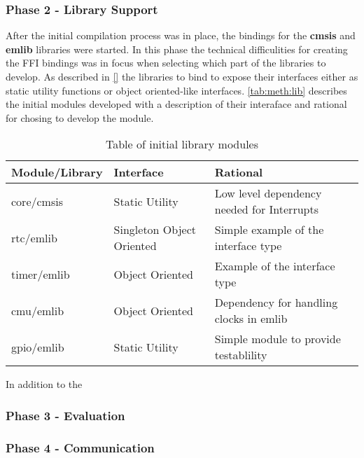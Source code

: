 \subsubsection{Phase 2 - Library Support}

After the initial compilation process was in place, the bindings for the \textbf{cmsis} and \textbf{emlib} libraries were started.
In this phase the technical difficulities for creating the FFI bindings was in focus when selecting which part of the libraries to develop.
As described in \autoref{}  the libraries to bind to expose their interfaces either as static utility functions or object oriented-like interfaces.
\autoref{tab:meth:lib} describes the initial modules developed with a description of their interaface and rational for chosing to develop the module.

\begin{table}[H]
  \begin{center}
    \begin{tabular}{|l|l|l|}
      \hline
      Module/Library & Interface & Rational \\
      \hline
      \hline
      core/cmsis & Static Utility & Low level dependency needed for Interrupts \\
      rtc/emlib & Singleton Object Oriented & Simple example of the interface type \\
      timer/emlib & Object Oriented & Example of the interface type \\
      cmu/emlib & Object Oriented & Dependency for handling clocks in emlib \\
      gpio/emlib & Static Utility & Simple module to provide testablility \\
    \end{tabular}
  \end{center}
  \caption{Table of initial library modules}
  \label{tab:meth:lib}
\end{table}

In addition to the

\subsubsection{Phase 3 - Evaluation}

\subsubsection{Phase 4 - Communication}

